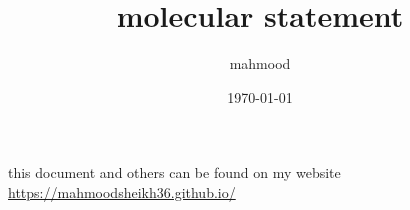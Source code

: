 \documentclass[a4paper,12pt]{article}
\author{mahmood}
\date{\today}
\title{molecular statement}
\begin{document}
\maketitle
\begin{note}
this document and others can be found on my website\\
\url{https://mahmoodsheikh36.github.io/}
\end{note}
\end{document}
